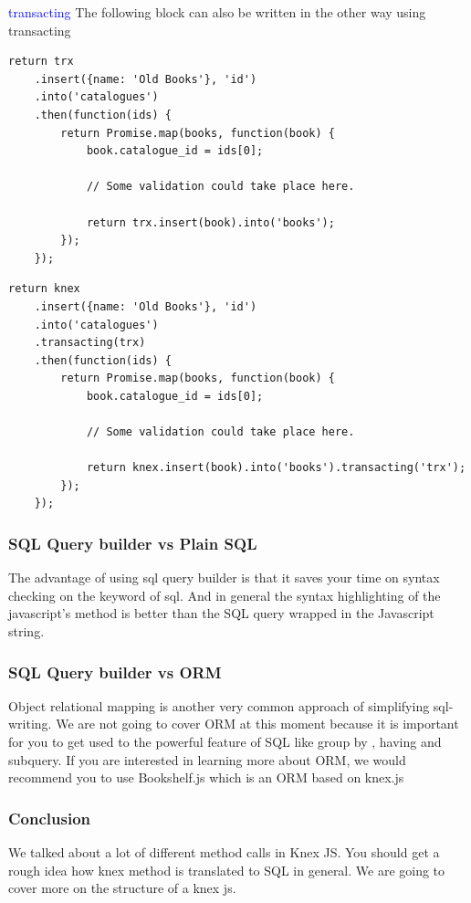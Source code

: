 \documentclass[a4paper]{article}
\begin{document}
\textcolor{blue}{transacting}
The following block can also be written in the other way using transacting
\begin{lstlisting}
return trx
    .insert({name: 'Old Books'}, 'id')
    .into('catalogues')
    .then(function(ids) {
        return Promise.map(books, function(book) {
            book.catalogue_id = ids[0];

            // Some validation could take place here.

            return trx.insert(book).into('books');
        });
    });
\end{lstlisting}
\begin{lstlisting}
return knex
    .insert({name: 'Old Books'}, 'id')
    .into('catalogues')
    .transacting(trx)
    .then(function(ids) {
        return Promise.map(books, function(book) {
            book.catalogue_id = ids[0];

            // Some validation could take place here.

            return knex.insert(book).into('books').transacting('trx');
        });
    });
\end{lstlisting}
\subsubsection{SQL Query builder vs Plain SQL}
The advantage of using sql query builder is that it saves your time on syntax checking on the keyword of sql. And in general the syntax highlighting of the javascript’s method is better than the SQL query wrapped in the Javascript string.


\subsubsection{SQL Query builder vs ORM}
Object relational mapping is another very common approach of simplifying sql-writing. We are not going to cover ORM at this moment because it is important for you to get used to the powerful feature of SQL like group by , having and subquery. If you are interested in learning more about ORM, we would recommend you to use Bookshelf.js which is an ORM based on knex.js
\subsubsection{Conclusion}
We talked about a lot of different method calls in Knex JS. You should get a rough idea how knex method is translated to SQL in general. We are going to cover more on the structure of a knex js.
\end{document}
